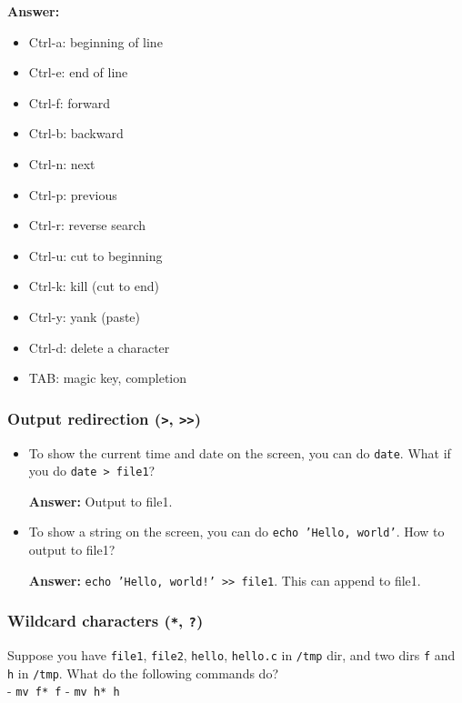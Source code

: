 \documentclass{swfucoursework}
\begin{document}
\textbf{Answer:}

\begin{itemize}
\tightlist
\item
  Ctrl-a: beginning of line
\item
  Ctrl-e: end of line
\item
  Ctrl-f: forward
\item
  Ctrl-b: backward
\item
  Ctrl-n: next
\item
  Ctrl-p: previous
\item
  Ctrl-r: reverse search
\item
  Ctrl-u: cut to beginning
\item
  Ctrl-k: kill (cut to end)
\item
  Ctrl-y: yank (paste)
\item
  Ctrl-d: delete a character
\item
  TAB: magic key, completion
\end{itemize}

\subsubsection{\texorpdfstring{Output redirection
(\texttt{>},
\texttt{>>})}{Output redirection (, )}}\label{output-redirection}

\begin{itemize}
\item
  To show the current time and date on the screen, you can do
  \texttt{date}. What if you do
  \texttt{date > file1}?

  \textbf{Answer:} Output to file1.
\item
  To show a string on the screen, you can do
  \texttt{echo 'Hello, world'}. How to output to file1?

  \textbf{Answer:} \texttt{echo 'Hello, world!' >> file1}.
  This can append to file1.
\end{itemize}

\subsubsection{\texorpdfstring{Wildcard characters
(\texttt{*},
\texttt{?})}{Wildcard characters (, )}}\label{wildcard-characters}

Suppose you have \texttt{file1}, \texttt{file2},
\texttt{hello}, \texttt{hello.c} in
\texttt{/tmp} dir, and two dirs \texttt{f} and
\texttt{h} in \texttt{/tmp}. What do the
following commands do?\\
- \texttt{mv f* f} - \texttt{mv h* h}
\end{document}
